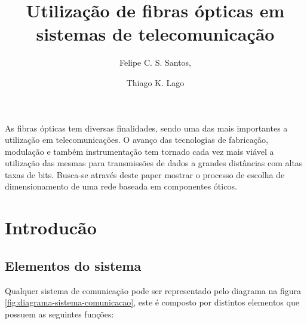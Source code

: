 \documentclass[article]{IEEEtran}
\begin{document}
%
\title{Utilização de fibras ópticas em sistemas de telecomunicação}




\author{
	Felipe C. S. Santos,
	\and
	Thiago K. Lago
	
}






\maketitle

\IEEEdisplaynontitleabstractindextext
As fibras ópticas tem diversas finalidades, sendo uma das mais importantes a utilização em telecomunicações. O avanço das tecnologias de fabricação, modulação e também instrumentação tem tornado cada vez mais viável a utilização das mesmas para transmissões de dados a grandes distâncias com altas taxas de bits. Busca-se através deste paper mostrar o processo de escolha de dimensionamento de uma rede baseada em componentes óticos.
\IEEEpeerreviewmaketitle



\section{Introducão}
\subsection{Elementos do sistema}
\par Qualquer sistema de comunicação pode ser representado pelo diagrama na figura \ref{fig:diagrama-sistema-comunicacao}, este é composto por distintos elementos que possuem as seguintes funções: \cite{FUND_OPT}
\end{document}
